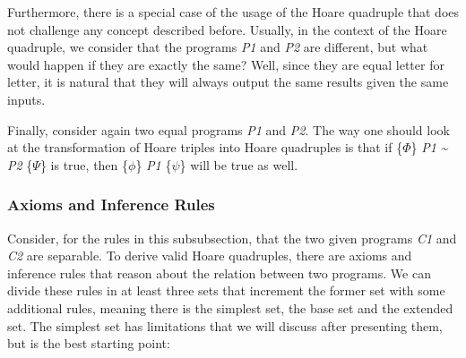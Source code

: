 Furthermore, there is a special case of the usage of the Hoare quadruple that does not challenge any concept described before.
Usually, in the context of the Hoare quadruple, we consider that the programs \emph{P1} and \emph{P2} are different, but what would happen if they are exactly the same?
Well, since they are equal letter for letter, it is natural that they will always output the same results given the same inputs.

Finally, consider again two equal programs \emph{P1} and \emph{P2}.
The way one should look at the transformation of Hoare triples into Hoare quadruples is that if \{$\Phi$\} \emph{P1} \emph{\textasciitilde} \emph{P2} \{$\Psi$\} is true, then \{$\phi$\} \emph{P1} \{$\psi$\} will be true as well.


\subsubsection{Axioms and Inference Rules}
\label{sub:relational_hoare_logic_formal_proof_rules}

Consider, for the rules in this subsubsection, that the two given programs \emph{C1} and \emph{C2} are separable.
To derive valid Hoare quadruples, there are axioms and inference rules that reason about the relation between two programs.
We can divide these rules in at least three sets that increment the former set with some additional rules, meaning there is the simplest set, the base set and the extended set.
The simplest set has limitations that we will discuss after presenting them, but is the best starting point:

